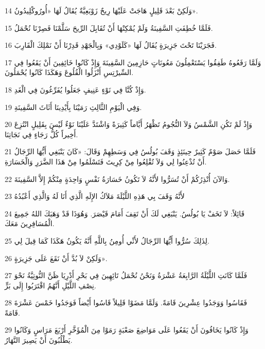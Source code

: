 \par 14 وَلَكِنْ بَعْدَ قَلِيلٍ هَاجَتْ عَلَيْهَا رِيحٌ زَوْبَعِيَّةٌ يُقَالُ لَهَا «أُورُوكْلِيدُونُ».
\par 15 فَلَمَّا خُطِفَتِ السَّفِينَةُ وَلَمْ يُمْكِنْهَا أَنْ تُقَابِلَ الرِّيحَ سَلَّمْنَا فَصِرْنَا نُحْمَلُ.
\par 16 فَجَرَيْنَا تَحْتَ جَزِيرَةٍ يُقَالُ لَهَا «كَلَوْدِي» وَبِالْجَهْدِ قَدِرْنَا أَنْ نَمْلِكَ الْقَارِبَ.
\par 17 وَلَمَّا رَفَعُوهُ طَفِقُوا يَسْتَعْمِلُونَ مَعُونَاتٍ حَازِمِينَ السَّفِينَةَ وَإِذْ كَانُوا خَائِفِينَ أَنْ يَقَعُوا فِي السِّيرْتِسِ أَنْزَلُوا الْقُلُوعَ وَهَكَذَا كَانُوا يُحْمَلُونَ.
\par 18 وَإِذْ كُنَّا فِي نَوْءٍ عَنِيفٍ جَعَلُوا يُفَرِّغُونَ فِي الْغَدِ.
\par 19 وَفِي الْيَوْمِ الثَّالِثِ رَمَيْنَا بِأَيْدِينَا أَثَاثَ السَّفِينَةِ.
\par 20 وَإِذْ لَمْ تَكُنِ الشَّمْسُ وَلاَ النُّجُومُ تَظْهَرُ أَيَّاماً كَثِيرَةً وَاشْتَدَّ عَلَيْنَا نَوْءٌ لَيْسَ بِقَلِيلٍ انْتُزِعَ أَخِيراً كُلُّ رَجَاءٍ فِي نَجَاتِنَا.
\par 21 فَلَمَّا حَصَلَ صَوْمٌ كَثِيرٌ حِينَئِذٍ وَقَفَ بُولُسُ فِي وَسَطِهِمْ وَقَالَ: «كَانَ يَنْبَغِي أَيُّهَا الرِّجَالُ أَنْ تُذْعِنُوا لِي وَلاَ تُقْلِعُوا مِنْ كِرِيتَ فَتَسْلَمُوا مِنْ هَذَا الضَّرَرِ وَالْخَسَارَةِ.
\par 22 وَالآنَ أُنْذِرُكُمْ أَنْ تُسَرُّوا لأَنَّهُ لاَ تَكُونُ خَسَارَةُ نَفْسٍ وَاحِدَةٍ مِنْكُمْ إِلاَّ السَّفِينَةَ.
\par 23 لأَنَّهُ وَقَفَ بِي هَذِهِ اللَّيْلَةَ مَلاَكُ الإِلَهِ الَّذِي أَنَا لَهُ وَالَّذِي أَعْبُدُهُ
\par 24 قَائِلاً: لاَ تَخَفْ يَا بُولُسُ. يَنْبَغِي لَكَ أَنْ تَقِفَ أَمَامَ قَيْصَرَ. وَهُوَذَا قَدْ وَهَبَكَ اللهُ جَمِيعَ الْمُسَافِرِينَ مَعَكَ.
\par 25 لِذَلِكَ سُرُّوا أَيُّهَا الرِّجَالُ لأَنِّي أُومِنُ بِاللَّهِ أَنَّهُ يَكُونُ هَكَذَا كَمَا قِيلَ لِي.
\par 26 وَلَكِنْ لاَ بُدَّ أَنْ نَقَعَ عَلَى جَزِيرَةٍ».
\par 27 فَلَمَّا كَانَتِ اللَّيْلَةُ الرَّابِعَةُ عَشْرَةُ وَنَحْنُ نُحْمَلُ تَائِهِينَ فِي بَحْرِ أَدْرِيَا ظَنَّ النُّوتِيَّةُ نَحْوَ نِصْفِ اللَّيْلِ أَنَّهُمُ اقْتَرَبُوا إِلَى بَرٍّ.
\par 28 فَقَاسُوا وَوَجَدُوا عِشْرِينَ قَامَةً. وَلَمَّا مَضَوْا قَلِيلاً قَاسُوا أَيْضاً فَوَجَدُوا خَمْسَ عَشْرَةَ قَامَةً.
\par 29 وَإِذْ كَانُوا يَخَافُونَ أَنْ يَقَعُوا عَلَى مَوَاضِعَ صَعْبَةٍ رَمَوْا مِنَ الْمُؤَخَّرِ أَرْبَعَ مَرَاسٍ وَكَانُوا يَطْلُبُونَ أَنْ يَصِيرَ النَّهَارُ.

